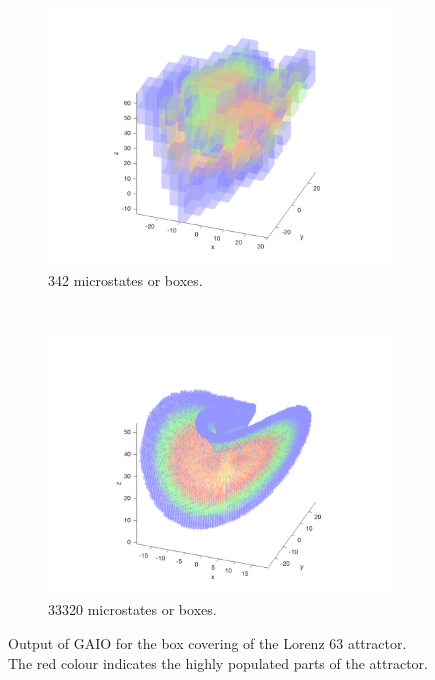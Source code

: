 \begin{figure}[H]
	\centering
	\begin{subfigure}[b]{0.4\textwidth}
		\includegraphics[width=\textwidth]{l63n10.png}
		\caption{342 microstates or boxes.}
		\label{l63n10}
	\end{subfigure}
	~ %
	\begin{subfigure}[b]{0.4\textwidth}
		\includegraphics[width=\textwidth]{l63n21.png}
		\caption{33320 microstates or boxes.}
	\end{subfigure}
	\caption{\label{pololo} Output of GAIO for the box covering of the Lorenz 63 attractor. The red colour indicates the highly populated parts of the attractor.}
\end{figure}

